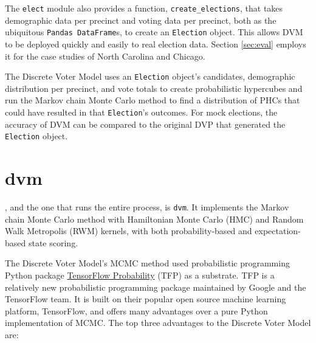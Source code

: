 The \texttt{elect} module also provides a function, \texttt{create\_elections}, that takes demographic data per precinct and voting data per precinct, both as the ubiquitous \texttt{Pandas DataFrame}s, to create an \texttt{Election} object. This allows DVM to be deployed quickly and easily to real election data. Section \ref{sec:eval} employs it for the case studies of North Carolina and Chicago.

The Discrete Voter Model uses an \texttt{Election} object's candidates, demographic distribution per precinct, and vote totals to create probabilistic hypercubes and run the Markov chain Monte Carlo method to find a distribution of PHCs that could have resulted in that \texttt{Election}'s outcomes. For mock elections, the accuracy of DVM can be compared to the original DVP that generated the \texttt{Election} object.


\section{dvm}
\label{sec:dvm}

, and the one that runs the entire process, is \texttt{dvm}. It implements the Markov chain Monte Carlo method with Hamiltonian Monte Carlo (HMC) and Random Walk Metropolis (RWM) kernels, with both probability-based and expectation-based state scoring.

The Discrete Voter Model's MCMC method used probabilistic programming Python package \href{https://www.tensorflow.org/probability}{TensorFlow Probability} (TFP) as a substrate. TFP is a relatively new probabilistic programming package maintained by Google and the TensorFlow team. It is built on their popular open source machine learning platform, TensorFlow, and offers many advantages over a pure Python implementation of MCMC.\cite{tfp} The top three advantages to the Discrete Voter Model are:

